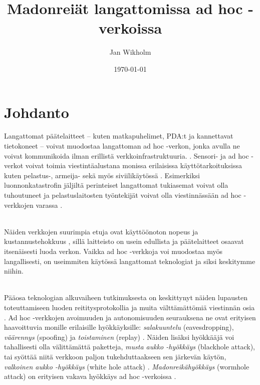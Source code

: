 \documentclass[finnish]{tktltiki2}
\title{Madonreiät langattomissa ad hoc -verkoissa}
\author{Jan Wikholm}
\date{\today}
\theoremstyle{definition}
\theoremstyle{remark}
\begin{document}

\frontmatter      %

\maketitle        %
\makeabstract     %

\tableofcontents  %


\mainmatter       %

\section{Johdanto}



Langattomat päätelaitteet -- kuten matkapuhelimet, PDA:t ja kannettavat tietokoneet -- voivat muodostaa langattoman ad hoc -verkon, jonka avulla ne voivat kommunikoida ilman erillistä verkkoinfrastruktuuria. \cite{delphi}. Sensori- ja ad hoc -verkot voivat toimia viestintäalustana monissa erilaisissa käyttötarkoituksissa kuten pelastus-, armeija- \cite{leashes} sekä myös siviilikäytössä \cite{liteworp}. Esimerkiksi luonnonkatastrofin jäljiltä perinteiset langattomat tukiasemat voivat olla tuhoutuneet ja pelastuslaitosten työntekijät voivat olla viestinnässään ad hoc -verkkojen varassa \cite{leashes}.

\noindent \\
Näiden verkkojen suurimpia etuja ovat käyttöönoton nopeus ja kustannustehokkuus \cite{delphi,leashes}, sillä laitteisto on usein edullista ja päätelaitteet osaavat itsenäisesti luoda verkon. Vaikka ad hoc -verkkoja voi muodostaa myös langallisesti, on useimmiten käytössä langattomat teknologiat \cite{leashes} ja siksi keskitymme niihin.

\noindent \\
Pääosa teknologian alkuvaiheen tutkimuksesta on keskittynyt näiden lupausten toteuttamiseen luoden reititysprotokollia ja muita välttämättömiä viestinnän osia \cite{liteworp}. Ad hoc -verkkojen avoimuuden ja autonomisuuden seurauksena ne ovat erityisen haavoittuvia monille erilaisille hyökkäyksille: \emph{salakuuntelu} (eavesdropping), \emph{väärennys} (spoofing) ja \emph{toistaminen} (replay) \cite{leashes}. Näiden lisäksi hyökkääjä voi tahallisesti olla välittämättä paketteja,  \emph{musta aukko -hyökkäys} (blackhole attack), tai syöttää niitä verkkoon paljon tukehduttaakseen sen järkevän käytön,  \emph{valkoinen aukko -hyökkäys} (white hole attack) \cite{delphi}. \emph{Madonreikähyökkäys} (wormhole attack) on erityisen vakava hyökkäys ad hoc -verkoissa \cite{liteworp}.
\end{document}
